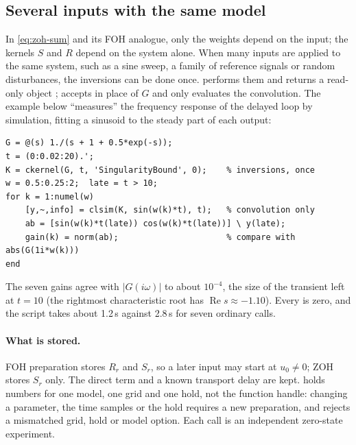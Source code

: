 \subsection{Several inputs with the same model}

In \eqref{eq:zoh-sum} and its FOH analogue, only the weights depend on the
input; the kernels $S$ and $R$ depend on the system alone. When many inputs
are applied to the same system, such as a sine sweep, a family of reference
signals or random disturbances, the inversions can be done once.
 performs them and returns a read-only object ;
 accepts  in place of $G$ and only evaluates the
convolution. The example below ``measures'' the frequency response of the
delayed loop by simulation, fitting a sinusoid to the steady part of each
output:
\begin{lstlisting}
G = @(s) 1./(s + 1 + 0.5*exp(-s));
t = (0:0.02:20).';
K = ckernel(G, t, 'SingularityBound', 0);    % inversions, once
w = 0.5:0.25:2;  late = t > 10;
for k = 1:numel(w)
    [y,~,info] = clsim(K, sin(w(k)*t), t);   % convolution only
    ab = [sin(w(k)*t(late)) cos(w(k)*t(late))] \ y(late);
    gain(k) = norm(ab);                      % compare with abs(G(1i*w(k)))
end
\end{lstlisting}
The seven gains agree with $|G(i\omega)|$ to about $10^{-4}$, the size of
the transient left at $t = 10$ (the rightmost characteristic root has
$\operatorname{Re}s\approx-1.10$). Every  is zero,
and the script takes about 1.2\,s against 2.8\,s for seven ordinary calls.

\paragraph{What is stored.} FOH preparation stores $R_r$ and $S_r$, so a
later input may start at $u_0\ne0$; ZOH stores $S_r$ only. The direct term
and a known transport delay are kept.  holds numbers for one model,
one grid and one hold, not the function handle: changing a parameter, the
time samples or the hold requires a new preparation, and 
rejects a mismatched grid, hold or model option. Each call is an
independent zero-state experiment.

